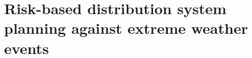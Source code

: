 \documentclass[hidelinks, 12pt]{article}
\begin{document}





\section{Risk-based distribution system planning against extreme weather events} 

\newpage


\clearpage


\clearpage



\newpage


\newpage



\end{document}
